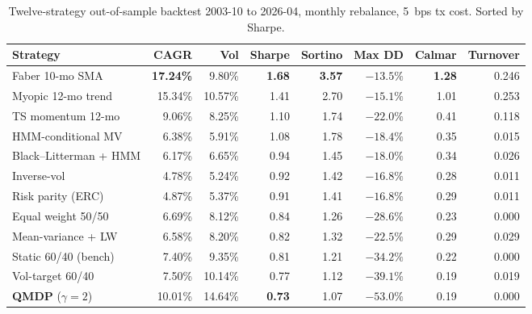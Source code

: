 \documentclass[11pt]{article}
\begin{document}
\begin{table}[H]\centering\small\setlength{\tabcolsep}{4pt}\renewcommand{\arraystretch}{1.1}
\caption{Twelve-strategy out-of-sample backtest 2003-10 to 2026-04, monthly rebalance, 5~bps tx cost. Sorted by Sharpe.}\label{tab:horserace}
\begin{tabular}{l rrrrrrr}
\toprule
\textbf{Strategy} & \textbf{CAGR} & \textbf{Vol} & \textbf{Sharpe} & \textbf{Sortino} & \textbf{Max DD} & \textbf{Calmar} & \textbf{Turnover} \\
\midrule
Faber 10-mo SMA         & \textbf{17.24\%} & 9.80\%  & \textbf{1.68} & \textbf{3.57} & $-13.5\%$ & \textbf{1.28} & 0.246 \\
Myopic 12-mo trend      & 15.34\%          & 10.57\% & 1.41         & 2.70         & $-15.1\%$ & 1.01         & 0.253 \\
TS momentum 12-mo       & 9.06\%           & 8.25\%  & 1.10         & 1.74         & $-22.0\%$ & 0.41         & 0.118 \\
HMM-conditional MV      & 6.38\%           & 5.91\%  & 1.08         & 1.78         & $-18.4\%$ & 0.35         & 0.015 \\
Black--Litterman + HMM  & 6.17\%           & 6.65\%  & 0.94         & 1.45         & $-18.0\%$ & 0.34         & 0.026 \\
Inverse-vol             & 4.78\%           & 5.24\%  & 0.92         & 1.42         & $-16.8\%$ & 0.28         & 0.011 \\
Risk parity (ERC)       & 4.87\%           & 5.37\%  & 0.91         & 1.41         & $-16.8\%$ & 0.29         & 0.011 \\
Equal weight 50/50      & 6.69\%           & 8.12\%  & 0.84         & 1.26         & $-28.6\%$ & 0.23         & 0.000 \\
Mean-variance + LW      & 6.58\%           & 8.20\%  & 0.82         & 1.32         & $-22.5\%$ & 0.29         & 0.029 \\
Static 60/40 (bench)    & 7.40\%           & 9.35\%  & 0.81         & 1.21         & $-34.2\%$ & 0.22         & 0.000 \\
Vol-target 60/40        & 7.50\%           & 10.14\% & 0.77         & 1.12         & $-39.1\%$ & 0.19         & 0.019 \\
\textbf{QMDP} ($\gamma{=}2$) & 10.01\%      & 14.64\% & \textbf{0.73} & 1.07         & $\mathbf{-53.0\%}$ & 0.19 & 0.000 \\
\bottomrule
\end{tabular}
\end{table}
\end{document}

